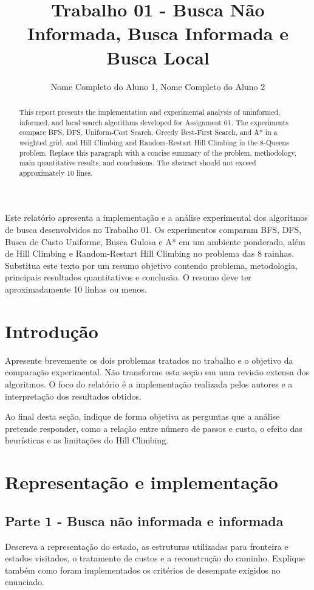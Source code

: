 \documentclass[12pt]{article}
\title{Trabalho 01 - Busca Não Informada, Busca Informada e Busca Local}
\author{Nome Completo do Aluno 1\inst{1}, Nome Completo do Aluno 2\inst{1}}
\begin{document}
\maketitle

\begin{abstract}
This report presents the implementation and experimental analysis of uninformed, informed, and local search algorithms developed for Assignment 01. The experiments compare BFS, DFS, Uniform-Cost Search, Greedy Best-First Search, and A* in a weighted grid, and Hill Climbing and Random-Restart Hill Climbing in the 8-Queens problem. Replace this paragraph with a concise summary of the problem, methodology, main quantitative results, and conclusions. The abstract should not exceed approximately 10 lines.
\end{abstract}

\begin{resumo}
Este relatório apresenta a implementação e a análise experimental dos algoritmos de busca desenvolvidos no Trabalho 01. Os experimentos comparam BFS, DFS, Busca de Custo Uniforme, Busca Gulosa e A* em um ambiente ponderado, além de Hill Climbing e Random-Restart Hill Climbing no problema das 8 rainhas. Substitua este texto por um resumo objetivo contendo problema, metodologia, principais resultados quantitativos e conclusão. O resumo deve ter aproximadamente 10 linhas ou menos.
\end{resumo}

\section{Introdução}
Apresente brevemente os dois problemas tratados no trabalho e o objetivo da comparação experimental. Não transforme esta seção em uma revisão extensa dos algoritmos. O foco do relatório é a implementação realizada pelos autores e a interpretação dos resultados obtidos.

Ao final desta seção, indique de forma objetiva as perguntas que a análise pretende responder, como a relação entre número de passos e custo, o efeito das heurísticas e as limitações do Hill Climbing.

\section{Representação e implementação}
\subsection{Parte 1 - Busca não informada e informada}
Descreva a representação do estado, as estruturas utilizadas para fronteira e estados visitados, o tratamento de custos e a reconstrução do caminho. Explique também como foram implementados os critérios de desempate exigidos no enunciado.
\end{document}
